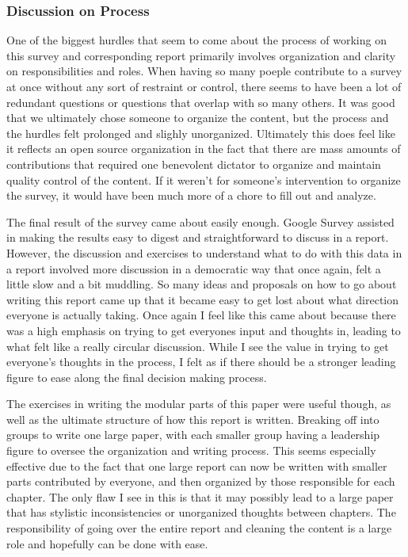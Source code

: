 \subsubsection{Discussion on Process}

One of the biggest hurdles that seem to come about the process of working on this survey and corresponding report primarily involves organization and clarity on responsibilities and roles. When having so many poeple contribute to a survey at once without any sort of restraint or control, there seems to have been a lot of redundant questions or questions that overlap with so many others. It was good that we ultimately chose someone to organize the content, but the process and the hurdles felt prolonged and slighly unorganized. Ultimately this does feel like it reflects an open source organization in the fact that there are mass amounts of contributions that required one benevolent dictator to organize and maintain quality control of the content. If it weren't for someone's intervention to organize the survey, it would have been much more of a chore to fill out and analyze. 

The final result of the survey came about easily enough. Google Survey assisted in making the results easy to digest and straightforward to discuss in a report. However, the discussion and exercises to understand what to do with this data in a report involved more discussion in a democratic way that once again, felt a little slow and a bit muddling. So many ideas and proposals on how to go about writing this report came up that it became easy to get lost about what direction everyone is actually taking. Once again I feel like this came about because there was a high emphasis on trying to get everyones input and thoughts in, leading to what felt like a really circular discussion. While I see the value in trying to get everyone's thoughts in the process, I felt as if there should be a stronger leading figure to ease along the final decision making process. 

The exercises in writing the modular parts of this paper were useful though, as well as the ultimate structure of how this report is written. Breaking off into groups to write one large paper, with each smaller group having a leadership figure to oversee the organization and writing process. This seems especially effective due to the fact that one large report can now be written with smaller parts contributed by everyone, and then organized by those responsible for each chapter. The only flaw I see in this is that it may possibly lead to a large paper that has stylistic inconsistencies or unorganized thoughts between chapters. The responsibility of going over the entire report and cleaning the content is a large role and hopefully can be done with ease. 